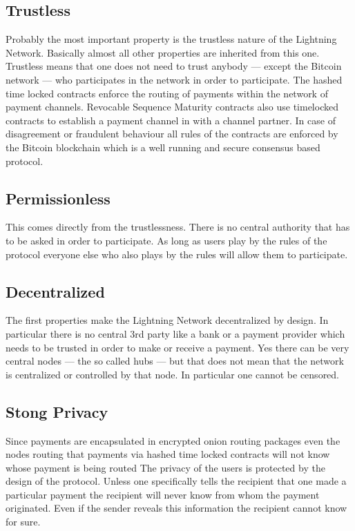 \documentclass[a4paper,12pt,oneside,openany]{book}
\begin{document}
\subsection{Trustless}
Probably the most important property is the trustless nature of the Lightning Network. Basically almost all other properties are inherited from this one. 
Trustless means that one does not need to trust anybody --- except the Bitcoin network --- who participates in the network in order to participate. 
The hashed time locked contracts enforce the routing of payments within the network of payment channels.
Revocable Sequence Maturity contracts also use timelocked contracts to establish a payment channel in with a channel partner.
In case of disagreement or fraudulent behaviour all rules of the contracts are enforced by the Bitcoin blockchain which is a well running and secure consensus based protocol. 

\subsection{Permissionless}
This comes directly from the trustlessness.
There is no central authority that has to be asked in order to participate.
As long as users play by the rules of the protocol everyone else who also plays by the rules will allow them to participate.

\subsection{Decentralized}
The first properties make the Lightning Network decentralized by design.
In particular there is no central 3rd party like a bank or a payment provider which needs to be trusted in order to make or receive a payment.
Yes there can be very central nodes --- the so called hubs --- but that does not mean that the network is centralized or controlled by that node.
In particular one cannot be censored. 

\subsection{Stong Privacy}
Since payments are encapsulated in encrypted onion routing packages even the nodes routing that payments via hashed time locked contracts will not know whose payment is being routed
The privacy of the users is protected by the design of the protocol.
Unless one specifically tells the recipient that one made a particular payment the recipient will never know from whom the payment originated.
Even if the sender reveals this information the recipient cannot know for sure.
\end{document}
